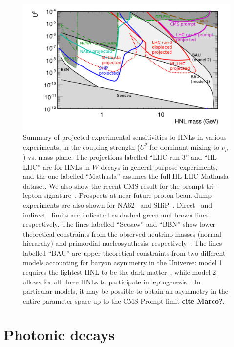 \begin{figure}[t]
\centering
\includegraphics[width=0.99\linewidth]{plots/BigPicture.png}
\caption{Summary of projected experimental sensitivities to HNLs in various experiments, in the coupling strength ($U^2$ for dominant mixing to $\nu_\mu$) vs. mass plane. The projections labelled ``LHC run-3'' and ``HL-LHC'' are for HNLs in $W$ decays in general-purpose experiments, and the one labelled ``Mathusla'' assumes the full HL-LHC Mathusla dataset. We also show the recent CMS result for the prompt tri-lepton signature~\cite{Sirunyan:2018mtv}. Prospects at near-future proton beam-dump experiments are also shown for NA62~\cite{Lanfranchi2017} and SHiP~\cite{SHiP2015}. Direct~\cite{Bernardi1988,CHARM1986,NuTeV1999,Delphi1997,CMS2015b} and indirect~\cite{MEG2013,Antusch2015} limits are indicated as dashed green and brown lines respectively. The lines labelled ``Seesaw'' and ``BBN'' show lower theoretical constraints from the observed neutrino masses (normal hierarchy) and primordial nucleosynthesis, respectively~\cite{Canetti2013b}. The lines labelled ``BAU'' are upper theoretical constraints from two different models accounting for baryon asymmetry in the Universe: model 1 requires the lightest HNL to be the dark matter~\cite{Canetti2013b}, while model 2 allows for all three HNLs to participate in leptogenesis~\cite{Canetti2014}. In particular models, it may be possible to obtain an asymmetry in the entire parameter space up to the CMS Prompt limit {\bf cite Marco?}. }
\label{fig:HNLsensitivity}
\end{figure}

\section{Photonic decays}
\label{subsec:dphotons}

